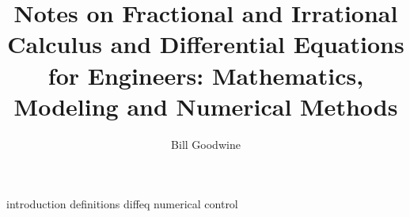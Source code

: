 \documentclass{book}
\title{Notes on Fractional and Irrational Calculus and Differential Equations for Engineers: Mathematics, Modeling and Numerical Methods}
\author{Bill Goodwine}
\begin{document}
\maketitle
\tableofcontents

{introduction}
{definitions}
{diffeq}
{numerical}
{control}

\backmatter


\end{document}
